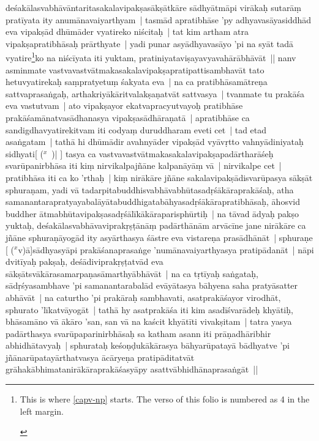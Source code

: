\documentclass[article,a4paper]{memoir}
\newcommand{\corr}[1]{($^{x}$#1)}
\begin{document}
deśakā\-lasvabhā\-vā\-ntaritasakalavipakṣasā\-kṣā\-tkā\-re sā\-dhyā\-tmā\-pi virā\-kaḥ sutarā\-ṃ pratī\-yata ity anumā\-navaiyarthyam | tasmā\-d apratibhā\-se 'py adhyavasā\-yasiddhā\-d eva vipakṣā\-d dhū\-mā\-der vyatireko niścitaḥ | tat kim artham atra vipakṣapratibhā\-saḥ prā\-rthyate | yadi punar asyā\-dhyavasā\-yo 'pi na syā\-t tadā\- vyatire\label{capv-np-4a-start}\footnote{\begin{english}This is where \cref{capv-np} starts. The verso of this folio is numbered as 4 in the left margin.\end{english}}ko na niścī\-yata iti yuktam, pratiniyataviṣayavyavahā\-rā\-bhā\-vā\-t || \label{thakur75-131.13} nanv asminmate vastvavastvā\-tmakasakalavipakṣapratipattisambhavā\-t tato hetuvyatirekaḥ saṃpratyetuṃ śakyata eva | na ca pratibhā\-samā\-treṇa sattvaprasaṅgaḥ, arthakriyā\-kā\-ritvalakṣaṇatvā\-t sattvasya | tvanmate tu prakā\-śa eva vastutvam | ato vipakṣayor ekatvapracyutvayoḥ pratibhā\-se prakā\-śamā\-natvasā\-dhanasya vipakṣasā\-dhā\-raṇatā\- | apratibhā\-se ca sandigdhavyatirekitvam iti codyaṃ duruddharam eveti cet | tad etad asaṅgatam | tathā\- hi dhū\-mā\-dir avahnyā\-der vipakṣā\-d vyā\-vṛtto vahnyā\-diniyataḥ sidhyati[ {\corr  | }] tasya ca vastvavastvā\-tmakasakalavipakṣapadā\-rtharā\-śeḥ svarū\-panirbhā\-sa iti kiṃ nirvikalpajñā\-ne kalpanā\-yā\-ṃ vā\- | nirvikalpe cet | pratibhā\-sa iti ca ko 'rthaḥ | kiṃ nirā\-kā\-re jñā\-ne sakalavipakṣā\-disvarū\-pasya sā\-kṣā\-t sphuraṇam, yadi vā\- tadarpitabuddhisvabhā\-vabhū\-tasadṛśā\-kā\-raprakā\-śaḥ, atha samanantarapratyayabalā\-yā\-tabuddhigatabā\-hyasadṛśā\-kā\-rapratibhā\-saḥ, ā\-hosvid buddher ā\-tmabhū\-tavipakṣasadṛśā\-lī\-kā\-kā\-raparisphū\-rtiḥ | \label{thakur75-131.24} na tā\-vad ā\-dyaḥ pakṣo yuktaḥ, deśakā\-\label{capv-np-4a-end}\label{capv-np-4b-start}lasvabhā\-vaviprakṛṣṭā\-nā\-ṃ padā\-rthā\-nā\-m arvā\-cī\-ne jane nirā\-kā\-re ca jñā\-ne sphuraṇā\-yogā\-d ity asyā\-rthasya śā\-stre eva vistareṇa prasā\-dhā\-nā\-t | sphuraṇe [ {\corr vā\-}]sā\-dhyasyā\-pi prakā\-śanaprasaṅge 'numā\-navaiyarthyasya pratipā\-danā\-t | \label{thakur75-131.27} nā\-pi dvitī\-yaḥ pakṣaḥ, deśā\-diviprakṛṣṭatvā\-d eva sā\-kṣā\-tsvā\-kā\-rasamarpaṇasā\-marthyā\-bhā\-vā\-t | \label{thakur75-131.29} na ca tṛtī\-yaḥ saṅgataḥ, sā\-dṛśyasambhave 'pi samanantarabalā\-d evā\-yā\-tasya bā\-hyena saha pratyā\-satter abhā\-vā\-t | \label{thakur75-131.31} na caturtho 'pi prakā\-raḥ sambhavati, asatprakā\-śayor virodhā\-t, sphurato 'lī\-katvā\-yogā\-t | tathā\- hy asatprakā\-śa iti kim asadī\-śvarā\-deḥ khyā\-tiḥ, bhā\-samā\-no vā\- ā\-kā\-ro 'san, san vā\- na kaścit khyā\-tī\-ti vivakṣitam | tatra yasya padā\-rthasya svarū\-paparinirbhā\-saḥ sa katham asann iti prā\-ṇadhā\-ribhir abhidhā\-tavyaḥ | sphurataḥ keśoṇḍukā\-kā\-rasya bā\-hyarū\-patayā\- bā\-dhyatve 'pi jñā\-narū\-patayā\-rthatvasya ā\-cā\-ryeṇa pratipā\-ditatvā\-t grā\-hakā\-bhimatanirā\-kā\-raprakā\-śasyā\-py asattvā\-bhidhā\-naprasaṅgā\-t || 
\end{document}
